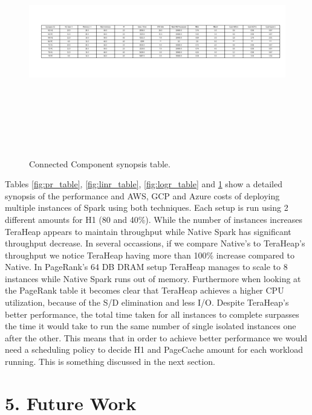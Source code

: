 \documentclass[twocolumn,10pt]{asme2e}
\begin{document}
\begin{figure}[h!]
        \includegraphics[width=20cm,height=10cm]{cc_table.png}
	\caption{Connected Component synopsis table.}
	\label{fig:cc_table}
\end{figure}


Tables \ref{fig:pr_table}, \ref{fig:linr_table}, \ref{fig:logr_table} and \ref{fig:cc_table} show a detailed synopsis of the performance and AWS, GCP and Azure costs of deploying multiple instances of Spark using both techniques. Each setup is run using 2 different amounts for H1 (80 and 40\%). While the number of instances increases TeraHeap appears to maintain throughput while Native Spark has significant throughput decrease. In several occassions, if we compare Native's to TeraHeap's throughput we notice TeraHeap having more than 100\% increase compared to Native. In PageRank's 64 DB DRAM setup TeraHeap manages to scale to 8 instances while Native Spark runs out of memory. Furthermore when looking at the PageRank table it becomes clear that TeraHeap achieves a higher CPU utilization, because of the S/D elimination and less I/O. Despite TeraHeap's better performance, the total time taken for all instances to complete surpasses the time it would take to run the same number of single isolated instances one after the other. This means that in order to achieve better performance we would need a scheduling policy to decide H1 and PageCache amount for each workload running. This is something discussed in the next section.

\section*{5. Future Work}
\end{document}
